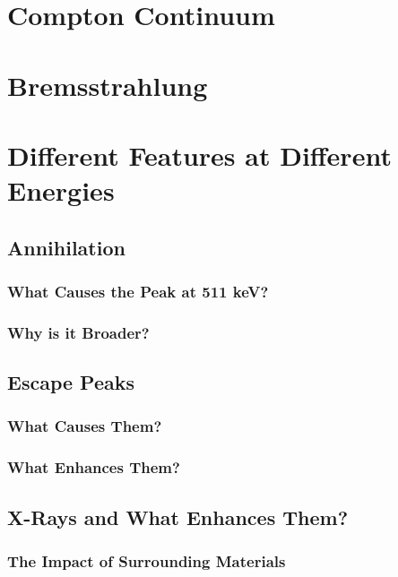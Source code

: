 \section{Compton Continuum}
\section{Bremsstrahlung}

\section{Different Features at Different Energies}
\subsection{Annihilation}
\subsubsection{What Causes the Peak at 511 keV?}
\subsubsection{Why is it Broader?}
\subsection{Escape Peaks}
\subsubsection{What Causes Them?}
\subsubsection{What Enhances Them?}
\subsection{X-Rays and What Enhances Them?}
\subsubsection{The Impact of Surrounding Materials}

